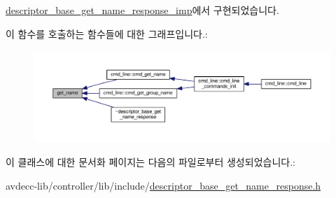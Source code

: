 \hyperlink{classavdecc__lib_1_1descriptor__base__get__name__response__imp_ae42f1e9a1cbc35a08f389805a8180e92}{descriptor\+\_\+base\+\_\+get\+\_\+name\+\_\+response\+\_\+imp}에서 구현되었습니다.



이 함수를 호출하는 함수들에 대한 그래프입니다.\+:
\nopagebreak
\begin{figure}[H]
\begin{center}
\leavevmode
\includegraphics[width=350pt]{classavdecc__lib_1_1descriptor__base__get__name__response_a8d13dc83e2fca08ad67c1218a0501081_icgraph}
\end{center}
\end{figure}




이 클래스에 대한 문서화 페이지는 다음의 파일로부터 생성되었습니다.\+:\begin{DoxyCompactItemize}
\item 
avdecc-\/lib/controller/lib/include/\hyperlink{descriptor__base__get__name__response_8h}{descriptor\+\_\+base\+\_\+get\+\_\+name\+\_\+response.\+h}\end{DoxyCompactItemize}
